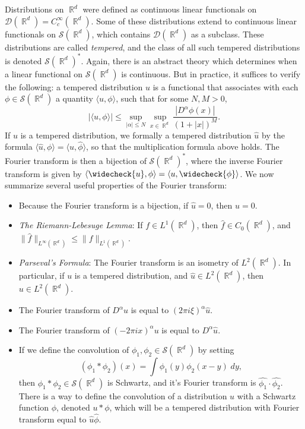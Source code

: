 \documentclass[answers]{exam}
\DeclareMathOperator{\RR}{\mathbb{R}}
\begin{document}
\begin{questions}
Distributions on $\RR^d$ were defined as continuous linear functionals on $\mathcal{D}(\RR^d) = C_c^\infty(\RR^d)$. Some of these distributions extend to continuous linear functionals on $\mathcal{S}(\RR^d)$, which contains $\mathcal{D}(\RR^d)$ as a subclass. These distributions are called \emph{tempered}, and the class of all such tempered distributions is denoted $\mathcal{S}(\RR^d)^*$. Again, there is an abstract theory which determines when a linear functional on $\mathcal{S}(\RR^d)$ is continuous. But in practice, it suffices to verify the following: a tempered distribution $u$ is a functional that associates with each $\phi \in \mathcal{S}(\RR^d)$ a quantity $\langle u, \phi \rangle$, such that for some $N,M > 0$,
%
\[ |\langle u, \phi \rangle| \leq \sup_{|\alpha| \leq N} \sup_{x \in \RR^d} \frac{|D^\alpha \phi(x)|}{(1 + |x|)^M}. \]
%
If $u$ is a tempered distribution, we formally a tempered distribution $\widehat{u}$ by the formula $\langle \widehat{u}, \phi \rangle = \langle u, \widehat{\phi} \rangle$, so that the multiplication formula above holds. The Fourier transform is then a bijection of $\mathcal{S}(\RR^d)^*$, where the inverse Fourier transform is given by $\langle \widecheck{u}, \phi \rangle = \langle u, \widecheck{\phi} \rangle$. We now summarize several useful properties of the Fourier transform:
%
\begin{itemize}
	\item Because the Fourier transform is a bijection, if $\widehat{u} = 0$, then $u = 0$.

	\item \emph{The Riemann-Lebesuge Lemma}: If $f \in L^1(\RR^d)$, then $\widehat{f} \in C_0(\RR^d)$, and $\| \widehat{f} \|_{L^\infty(\RR^d)} \leq \| f \|_{L^1(\RR^d)}$.

	\item \emph{Parseval's Formula}: The Fourier transform is an isometry of $L^2(\RR^d)$. In particular, if $u$ is a tempered distribution, and $\widehat{u} \in L^2(\RR^d)$, then $u \in L^2(\RR^d)$.

	\item The Fourier transform of $D^\alpha u$ is equal to $(2 \pi i \xi)^\alpha \widehat{u}$.

	\item The Fourier transform of $(- 2 \pi i x)^\alpha u$ is equal to $D^\alpha \widehat{u}$.

	\item If we define the convolution of $\phi_1, \phi_2 \in \mathcal{S}(\RR^d)$ by setting
	\[ (\phi_1 * \phi_2)(x) = \int \phi_1(y) \phi_2(x - y)\; dy, \]
	then $\phi_1 * \phi_2 \in \mathcal{S}(\RR^d)$ is Schwartz, and it's Fourier transform is $\widehat{\phi_1} \cdot \widehat{\phi_2}$. There is a way to define the convolution of a distribution $u$ with a Schwartz function $\phi$, denoted $u * \phi$, which will be a tempered distribution with Fourier transform equal to $\widehat{u} \widehat{\phi}$.
\end{itemize}










\end{questions}
\end{document}
